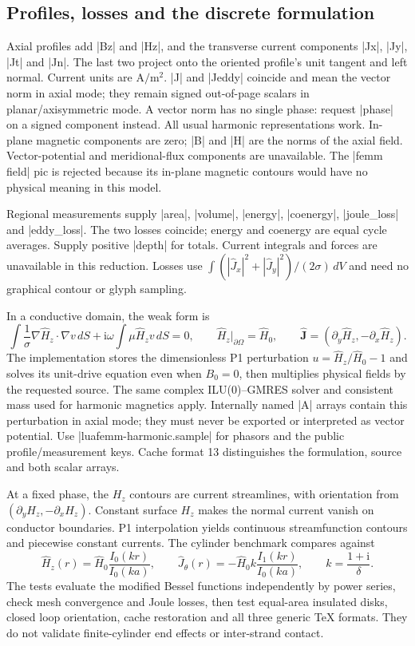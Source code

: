 \subsection{Profiles, losses and the discrete formulation}
Axial profiles add |Bz| and |Hz|, and the transverse current components
|Jx|, |Jy|, |Jt| and |Jn|. The last two project onto the oriented profile's
unit tangent and left normal. Current units are $\mathrm{A/m^2}$.
|J| and |Jeddy| coincide and mean the vector norm in axial mode; they remain
signed out-of-page scalars in planar/axisymmetric mode. A vector norm has no
single phase: request |phase| on a signed component instead. All usual harmonic
representations work. In-plane magnetic components are zero; |B| and |H|
are the norms of the axial field. Vector-potential and meridional-flux
components are unavailable. The |femm field| pic is rejected because its
in-plane magnetic contours would have no physical meaning in this model.

Regional measurements supply |area|, |volume|, |energy|, |coenergy|,
|joule_loss| and |eddy_loss|. The two losses coincide; energy and coenergy
are equal cycle averages. Supply positive |depth| for totals. Current integrals
and forces are unavailable in this reduction. Losses use
$\int(|\widehat J_x|^2+|\widehat J_y|^2)/(2\sigma)\,dV$ and need no graphical
contour or glyph sampling.

In a conductive domain, the weak form is
\[
 \int\frac1\sigma\nabla\widehat H_z\mathbin{\cdot}\nabla v\,dS
 +\mathrm i\omega\int\mu\widehat H_zv\,dS=0,
 \qquad \widehat H_z|_{\partial\Omega}=\widehat H_0,
 \qquad \widehat{\mathbf J}=(\partial_y\widehat H_z,-\partial_x\widehat H_z).
\]
The implementation stores the dimensionless P1 perturbation
$u=\widehat H_z/\widehat H_0-1$ and solves its unit-drive equation even when
$B_0=0$, then multiplies physical fields by the requested source. The same
complex ILU(0)--GMRES solver and consistent mass used for harmonic magnetics
apply. Internally named |A| arrays contain this perturbation in axial mode;
they must never be exported or interpreted as vector potential. Use
|luafemm-harmonic.sample| for phasors and the public profile/measurement keys.
Cache format 13 distinguishes the formulation, source and both scalar arrays.

At a fixed phase, the $H_z$ contours are current streamlines, with orientation
from $(\partial_yH_z,-\partial_xH_z)$. Constant surface $H_z$ makes the normal
current vanish on conductor boundaries. P1 interpolation yields continuous
streamfunction contours and piecewise constant currents. The cylinder benchmark
compares against
\[
 \widehat H_z(r)=\widehat H_0\frac{I_0(kr)}{I_0(ka)},\qquad
 \widehat J_\theta(r)=-\widehat H_0 k\frac{I_1(kr)}{I_0(ka)},\qquad
 k=\frac{1+\mathrm i}{\delta}.
\]
The tests evaluate the modified Bessel functions independently by power series,
check mesh convergence and Joule losses, then test equal-area insulated disks,
closed loop orientation, cache restoration and all three generic TeX formats.
They do not validate finite-cylinder end effects or inter-strand contact.
